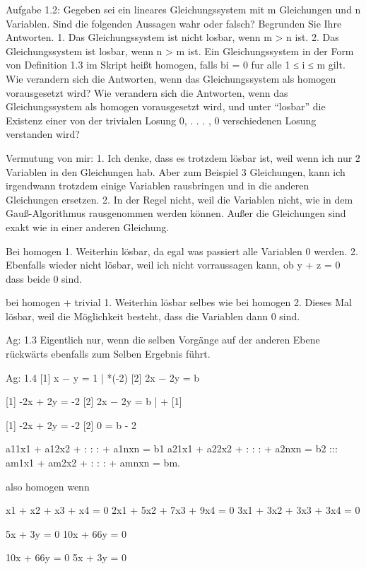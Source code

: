 Aufgabe 1.2: Gegeben sei ein lineares Gleichungssystem mit m Gleichungen
und n Variablen. Sind die folgenden Aussagen wahr oder falsch?
Begrunden Sie Ihre Antworten.
1. Das Gleichungssystem ist nicht losbar, wenn m > n ist.
2. Das Gleichungssystem ist losbar, wenn n > m ist.
Ein Gleichungssystem in der Form von Definition 1.3 im Skript heißt
homogen, falls bi = 0 fur alle 1 ≤ i ≤ m gilt.
Wie verandern sich die Antworten, wenn das Gleichungssystem als homogen
vorausgesetzt wird?
Wie verandern sich die Antworten, wenn das Gleichungssystem als homogen
vorausgesetzt wird, und unter “losbar” die Existenz einer von der trivialen
Losung 0, . . . , 0 verschiedenen Losung verstanden wird?

Vermutung von mir:
1. Ich denke, dass es trotzdem lösbar ist, weil wenn ich nur 2 Variablen
in den Gleichungen hab. Aber zum Beispiel 3 Gleichungen, kann ich
irgendwann trotzdem einige Variablen rausbringen und in die anderen
Gleichungen ersetzen.
2. In der Regel nicht, weil die Variablen nicht, wie in dem
Gauß-Algorithmus rausgenommen werden können. Außer die Gleichungen sind
exakt wie in einer anderen Gleichung.

Bei homogen
1. Weiterhin lösbar, da egal was passiert alle Variablen 0 werden.
2. Ebenfalls wieder nicht lösbar, weil ich nicht vorraussagen kann, ob y
+ z = 0 dass beide 0 sind.

bei homogen + trivial
1. Weiterhin lösbar selbes wie bei homogen
2. Dieses Mal lösbar, weil die Möglichkeit besteht, dass die Variablen
dann 0 sind.



Ag: 1.3
Eigentlich nur, wenn die selben Vorgänge auf der anderen Ebene rückwärts
ebenfalls zum
Selben Ergebnis führt.




Ag: 1.4
[1] x −  y = 1 | *(-2)
[2] 2x − 2y = b

[1] -2x + 2y = -2
[2]  2x − 2y = b  | + [1]

[1] -2x + 2y = -2
[2]  0 = b - 2


a11x1 + a12x2 + : : : + a1nxn = b1
a21x1 + a22x2 + : : : + a2nxn = b2
:::
am1x1 + am2x2 + : : : + amnxn = bm.



also homogen wenn


x1 + x2 + x3 + x4 = 0
2x1 + 5x2 + 7x3 + 9x4 = 0
3x1 + 3x2 + 3x3 + 3x4 = 0



5x + 3y = 0
10x + 66y = 0


10x + 66y = 0
5x + 3y = 0





